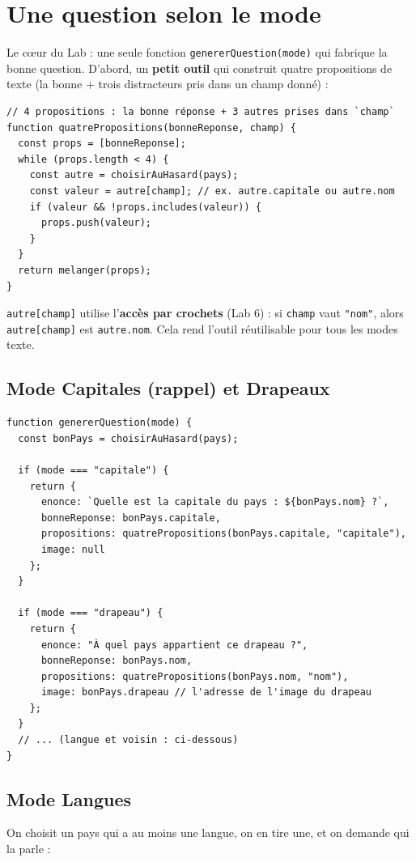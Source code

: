 \documentclass[11pt,a4paper]{article}
\newcommand{\code}[1]{\texttt{#1}}
\begin{document}
\section{Une question selon le mode}

Le cœur du Lab : une seule fonction \code{genererQuestion(mode)} qui fabrique la bonne question. D'abord, un \textbf{petit outil} qui construit quatre propositions de texte (la bonne + trois distracteurs pris dans un champ donné) :

\begin{lstlisting}[style=js]
// 4 propositions : la bonne réponse + 3 autres prises dans `champ`
function quatrePropositions(bonneReponse, champ) {
  const props = [bonneReponse];
  while (props.length < 4) {
    const autre = choisirAuHasard(pays);
    const valeur = autre[champ]; // ex. autre.capitale ou autre.nom
    if (valeur && !props.includes(valeur)) {
      props.push(valeur);
    }
  }
  return melanger(props);
}
\end{lstlisting}

\code{autre[champ]} utilise l'\textbf{accès par crochets} (Lab 6) : si \code{champ} vaut \code{"nom"}, alors \code{autre[champ]} est \code{autre.nom}. Cela rend l'outil réutilisable pour tous les modes texte.

\subsection{Mode Capitales (rappel) et Drapeaux}
\begin{lstlisting}[style=js]
function genererQuestion(mode) {
  const bonPays = choisirAuHasard(pays);

  if (mode === "capitale") {
    return {
      enonce: `Quelle est la capitale du pays : ${bonPays.nom} ?`,
      bonneReponse: bonPays.capitale,
      propositions: quatrePropositions(bonPays.capitale, "capitale"),
      image: null
    };
  }

  if (mode === "drapeau") {
    return {
      enonce: "À quel pays appartient ce drapeau ?",
      bonneReponse: bonPays.nom,
      propositions: quatrePropositions(bonPays.nom, "nom"),
      image: bonPays.drapeau // l'adresse de l'image du drapeau
    };
  }
  // ... (langue et voisin : ci-dessous)
}
\end{lstlisting}

\subsection{Mode Langues}
On choisit un pays qui a au moins une langue, on en tire une, et on demande qui la parle :
\end{document}
